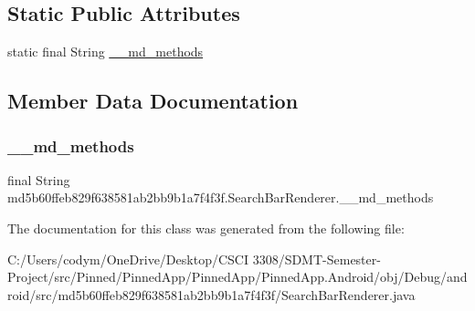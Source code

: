 \subsection*{Static Public Attributes}
\begin{DoxyCompactItemize}
\item 
static final String \hyperlink{classmd5b60ffeb829f638581ab2bb9b1a7f4f3f_1_1_search_bar_renderer_a5f0e642da7b2413e781c8137331a275e}{\+\_\+\+\_\+md\+\_\+methods}
\end{DoxyCompactItemize}


\subsection{Member Data Documentation}
\mbox{\label{classmd5b60ffeb829f638581ab2bb9b1a7f4f3f_1_1_search_bar_renderer_a5f0e642da7b2413e781c8137331a275e}} 
\subsubsection{\texorpdfstring{\+\_\+\+\_\+md\+\_\+methods}{\_\_md\_methods}}
{\footnotesize\ttfamily final String md5b60ffeb829f638581ab2bb9b1a7f4f3f.\+Search\+Bar\+Renderer.\+\_\+\+\_\+md\+\_\+methods\hspace{0.3cm}{\ttfamily [static]}}



The documentation for this class was generated from the following file\+:\begin{DoxyCompactItemize}
\item 
C\+:/\+Users/codym/\+One\+Drive/\+Desktop/\+C\+S\+C\+I 3308/\+S\+D\+M\+T-\/\+Semester-\/\+Project/src/\+Pinned/\+Pinned\+App/\+Pinned\+App/\+Pinned\+App.\+Android/obj/\+Debug/android/src/md5b60ffeb829f638581ab2bb9b1a7f4f3f/Search\+Bar\+Renderer.\+java\end{DoxyCompactItemize}

